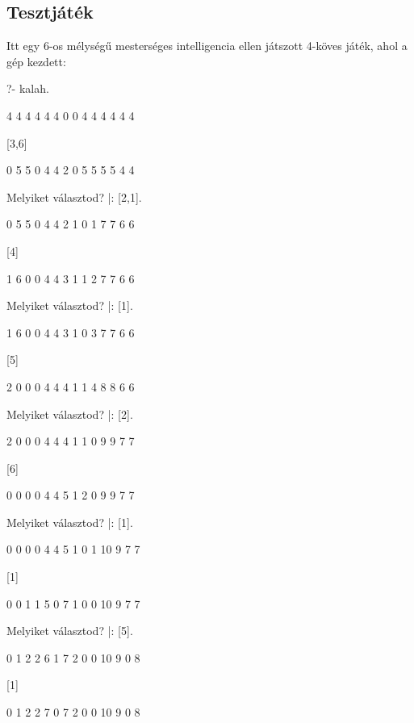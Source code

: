 \subsection*{Tesztjáték}
Itt egy 6-os mélységű mesterséges intelligencia
ellen játszott 4-köves játék, ahol a gép kezdett:
\begin{query}
?- kalah.

     4    4    4    4    4    4
0                                  0
     4    4    4    4    4    4

[3,6]

     0    5    5    0    4    4
2                                  0
     5    5    5    5    4    4

Melyiket választod?
|: [2,1].

     0    5    5    0    4    4
2                                  1
     0    1    7    7    6    6

[4]

     1    6    0    0    4    4
3                                  1
     1    2    7    7    6    6

Melyiket választod?
|: [1].

     1    6    0    0    4    4
3                                  1
     0    3    7    7    6    6

[5]

     2    0    0    0    4    4
4                                  1
     1    4    8    8    6    6

Melyiket választod?
|: [2].

     2    0    0    0    4    4
4                                  1
     1    0    9    9    7    7

[6]

     0    0    0    0    4    4
5                                  1
     2    0    9    9    7    7

Melyiket választod?
|: [1].

     0    0    0    0    4    4
5                                  1
     0    1    10   9    7    7

[1]

     0    0    1    1    5    0
7                                  1
     0    0    10   9    7    7

Melyiket választod?
|: [5].

     0    1    2    2    6    1
7                                  2
     0    0    10   9    0    8

[1]

     0    1    2    2    7    0
7                                  2
     0    0    10   9    0    8


\end{query}
